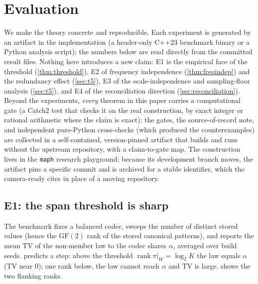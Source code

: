 \documentclass[11pt]{article}
\theoremstyle{definition}
\theoremstyle{plain}
\theoremstyle{remark}
\newcommand{\GF}{\mathrm{GF}(2)}
\DeclareMathOperator{\rank}{rank}
\newcommand{\W}{W}                          %
\newcommand{\proj}{\pi}                     %
\newcommand{\al}{\alpha}                    %
\begin{document}
\section{Evaluation}
\label{sec:experiments}

We make the theory concrete and reproducible. Each experiment is generated by an artifact
in the implementation (a header-only C++23 benchmark binary or a Python analysis script);
the numbers below are read directly from the committed result files. Nothing here
introduces a new claim: E1 is the empirical face of the threshold (\cref{thm:threshold}),
E2 of frequency independence (\cref{thm:freqindep}) and the redundancy effect
(\cref{sec:t5}), E3 of the scale-independence and sampling-floor analysis (\cref{sec:t5}),
and E4 of the reconciliation direction (\cref{sec:reconciliation}). Beyond the experiments,
\emph{every} theorem in this paper carries a computational gate (a Catch2 test that checks it
on the real construction, by exact integer or rational arithmetic where the claim is exact);
the gates, the source-of-record note, and independent pure-Python cross-checks (which produced
the counterexamples) are collected in a self-contained, version-pinned artifact that builds and
runs without the upstream repository, with a claim-to-gate map. The construction lives in the
\texttt{maph} research playground; because its development branch moves, the artifact pins a
specific commit and is archived for a stable identifier, which the camera-ready cites in place
of a moving repository.

\subsection{E1: the span threshold is sharp}

The benchmark fixes a balanced codec, sweeps the number of distinct stored values (hence
the $\GF$ rank of the stored canonical patterns), and reports the mean TV of the
non-member law to the codec shares $\al$, averaged over build seeds. 
predicts a step: above the threshold $\rank \proj|_{\W} = \log_2 K$ the law equals $\al$
(TV near $0$); one rank below, the law cannot reach $\al$ and TV is large.
 shows the two flanking ranks.
\end{document}
